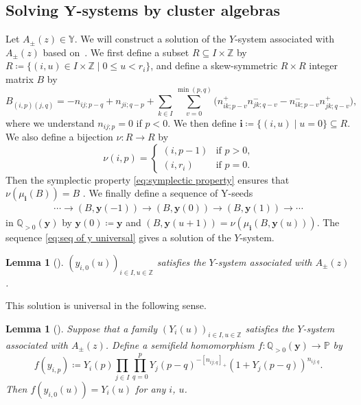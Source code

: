 \documentclass[10pt,a4paper]{amsart}
\numberwithin{equation}{section}
\newtheorem{Lemma}[Theorem]{Lemma}
\theoremstyle{definition}
\newcommand*{\maxzero}[1]{[#1]_{+}}
\begin{document}
\subsection[Solving Y-systems by cluster algebras]{Solving $\boldsymbol{ Y}$-systems by cluster algebras}
Let $A_\pm (z) \in \mathbb{Y}$.
We will construct a solution
of the $Y$-system associated with $A_\pm (z)$ based on~\cite[Section 3.3]{mizuno2020difference}.
We first define a subset $R \subseteq I \times \mathbb{Z}$ by
$
 R\coloneqq \{(i, u) \in I \times \mathbb{Z} \mid 0 \leq u < r_i \}$,
and define a skew-symmetric $R \times R$ integer matrix $B$ by
\begin{equation}\label{eq:def of B from cap}
 B_{(i, p)(j, q)} = - n_{ij;p-q} + n_{ji;q-p} +\sum_{k \in I} \sum_{v=0}^{\min(p,q)}
 \bigl( n_{ik;p-v}^{+} {n}_{jk;q-v}^{-}
 - n_{ik;p-v}^{-} {n}_{jk;q-v}^{+} \bigr),
\end{equation}
where we understand $n_{ij;p} = 0$ if $p < 0$.
We then define $\boldsymbol{i} \coloneqq \{ (i, u) \mid u=0 \} \subseteq R$.
We also define a bijection $\nu \colon R \to R$ by
\[%
	\nu (i, p) =
	\begin{cases}
		(i, p - 1) &\text{if $p > 0$,}\\
		(i, r_i) &\text{if $p=0$.}
	\end{cases}
\]
Then the symplectic property \eqref{eq:symplectic property} ensures that $\nu(\mu_{\boldsymbol{i}} (B)) = B$ \cite[Lemma 3.16]{mizuno2020difference}.
We finally define a sequence of Y-seeds
\begin{align}\label{eq:seq of y universal}
 \cdots \to (B, \boldsymbol{y}(-1)) \to (B, \boldsymbol{y}(0)) \to (B, \boldsymbol{y}(1)) \to \cdots
\end{align}
in $\mathbb{Q}_{> 0}(\boldsymbol{y})$ by
$\boldsymbol{y}(0) \coloneqq \boldsymbol{y}$ and
$(B, \boldsymbol{y}(u+1)) = \nu (\mu_{\boldsymbol{i}} (B, \boldsymbol{y}(u)))$.
The sequence \eqref{eq:seq of y universal} gives a solution of the $Y$-system.

\begin{Lemma}[{\cite[Theorem 3.13]{mizuno2020difference}}]\label{lemma:universal solution}
 $(y_{i, 0} (u))_{i \in I, u \in \mathbb{Z}}$ satisfies the $Y$-system associated with $A_\pm(z)$.
\end{Lemma}

This solution is universal in the following sense.
\begin{Lemma}[{\cite[Theorem 3.19]{mizuno2020difference}}]
 Suppose that a family $(Y_i(u))_{i \in I, u \in \mathbb{Z}}$ satisfies the $Y$-system associated with $A_\pm(z)$.
 Define a semifield homomorphism $f \colon \mathbb{Q}_{>0} (\boldsymbol{y}) \to \mathbb{P}$ by
 \[
		f(y_{i, p}) \coloneqq
 Y_i(p) \prod_{j \in I} \prod_{q=0}^{p} Y_j (p-q)^{- \maxzero{ n_{ij;q} }} (1 + Y_j (p-q) )^{n_{ij;q}}.
	\]
 Then $f(y_{i, 0} (u)) = Y_i(u)$ for any $i$, $u$.
\end{Lemma}
\end{document}
